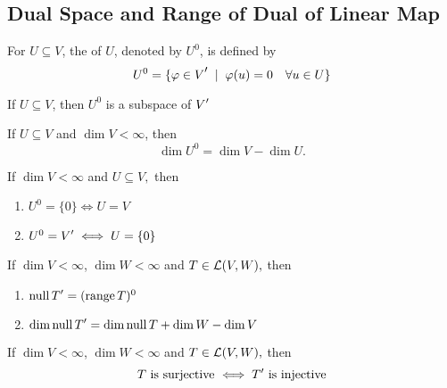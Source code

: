 \subsection{Dual Space and Range of Dual of Linear Map}

\begin{mydef} [annihilator, $U^0$]
  \label{def: annihiltator}
  For $U \subseteq V$, the  of $U$, denoted by $U^{0}$, is defined by
  \begin{equation}
    U^0 = \{ \varphi \in \dual{V} \; \mid \; \varphi (u) = 0 \quad \forall u \in U \}
  \end{equation}
\end{mydef}

\setcounter{thm}{123}
\begin{thm}
  \label{thm: the annihilator is a subspace}
  If $U \subseteq V$, then $U^{0}$ is a subspace of $\dual{V}$
\end{thm}

\setcounter{thm}{124}
\begin{thm} 
    If $U\subseteq V$ and $\dim V < \infty$, then
    \begin{equation}
      \dim U^0 = \dim V - \dim U.
    \end{equation}
\end{thm}

\setcounter{thm}{126}
\begin{thm} 
  If $\dim V < \infty$ and $U\subseteq V,$ then
  \begin{enumerate}
    \item $U^0 = \{0 \} \iff U = V$
    \item $U^0 = \dual{V} \iff U = \{0\}$
   \end{enumerate}
\end{thm}

\begin{thm}
  If $\dim V < \infty$, $\dim W<\infty$ and $T \in \mathcal{L} (V,W),$ then
  \begin{enumerate}
    \item $\mynull \dual{T} = (\myrange T)^0$
    \item $\dim \mynull \dual{T} = \dim \mynull T + \dim W - \dim V$
  \end{enumerate} 
\end{thm}

\begin{thm}
    If $\dim V < \infty$, $\dim W<\infty$ and $T \in \mathcal{L} (V,W),$ then
  \begin{equation}
    T$ is surjective $ \iff \dual{T} $ is injective$
  \end{equation}
\end{thm}


